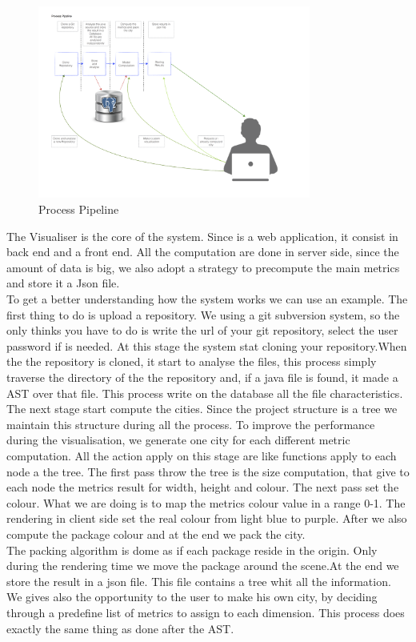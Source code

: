 \documentclass[]{usiinfbachelorproject}
\begin{document}
\begin{figure}[H]
	\centering
	\includegraphics[width=0.8\textwidth]{images/processPipeline}
	
	\caption[Process Pipeline]{Process Pipeline\label{fig:processPipeline}}

\end{figure}

The Visualiser is the core of the system. Since is a web application, it consist in back end and a front end. All the computation are done in server side, since the amount of data is big, we also adopt a strategy to precompute the main metrics and store it a Json file.\\
To get a better understanding how the system works we can use an example. The first thing to do is upload a repository. We using a git subversion system, so the only thinks you have to do is write the url of your git repository, select the user password if is needed. At this stage the system stat cloning your repository.When the the repository is cloned, it start to analyse the files, this process simply traverse the directory of the the repository and, if a java file is found, it made a AST over that file. This process write on the database all the file characteristics. \\

The next stage  start compute the cities. Since the project structure is a tree we maintain this structure during all the process. To improve the performance during the visualisation, we generate one city for each different metric computation. All the action apply on this stage are like  functions apply to each node a the tree. The first pass throw the tree is the size computation, that give to each node the metrics result for width, height and colour. The next pass set the colour. What we are doing is to map the metrics colour value in a range 0-1. The rendering in client side set the real colour from light blue to purple. After we also compute the package colour and at the end we pack the city.\\
The packing algorithm is dome as if each package reside in the origin. Only during the rendering time we move the package around the scene.At the end we store the result in a json file. This file contains a tree whit all the information.\\
We gives also the opportunity to the user to make his own city, by deciding through a predefine list of metrics to assign to each  dimension. This process does exactly the same thing as done after the AST.\\
\end{document}
